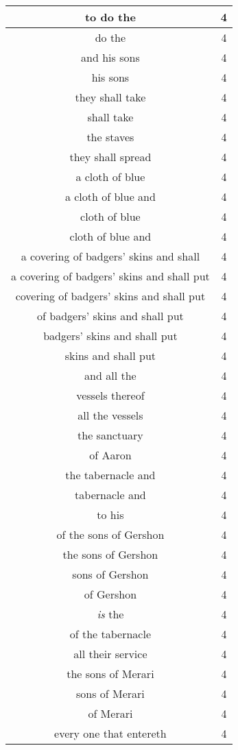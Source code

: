 \begin{center}
\begin{longtable}{|c|c|}
to do the & 4\\ \hline 
do the & 4\\ \hline 
and his sons & 4\\ \hline 
his sons & 4\\ \hline 
they shall take & 4\\ \hline 
shall take & 4\\ \hline 
the staves & 4\\ \hline 
they shall spread & 4\\ \hline 
a cloth of blue & 4\\ \hline 
a cloth of blue and & 4\\ \hline 
cloth of blue & 4\\ \hline 
cloth of blue and & 4\\ \hline 
a covering of badgers' skins and shall & 4\\ \hline 
a covering of badgers' skins and shall put & 4\\ \hline 
covering of badgers' skins and shall put & 4\\ \hline 
of badgers' skins and shall put & 4\\ \hline 
badgers' skins and shall put & 4\\ \hline 
skins and shall put & 4\\ \hline 
and all the & 4\\ \hline 
vessels thereof & 4\\ \hline 
all the vessels & 4\\ \hline 
the sanctuary & 4\\ \hline 
of Aaron & 4\\ \hline 
the tabernacle and & 4\\ \hline 
tabernacle and & 4\\ \hline 
to his & 4\\ \hline 
of the sons of Gershon & 4\\ \hline 
the sons of Gershon & 4\\ \hline 
sons of Gershon & 4\\ \hline 
of Gershon & 4\\ \hline 
\emph{is} the & 4\\ \hline 
of the tabernacle & 4\\ \hline 
all their service & 4\\ \hline 
the sons of Merari & 4\\ \hline 
sons of Merari & 4\\ \hline 
of Merari & 4\\ \hline 
every one that entereth & 4\\ \hline 

\end{longtable}
\end{center}
